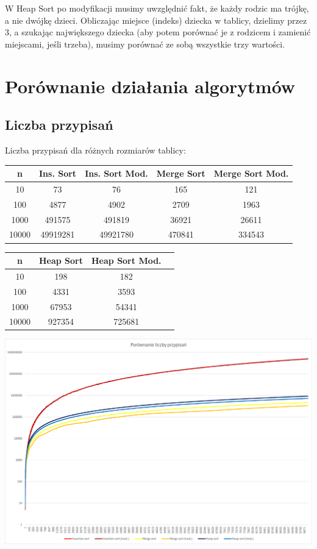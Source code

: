\documentclass{article}
\begin{document}
W Heap Sort po modyfikacji musimy uwzględnić fakt, że każdy rodzic ma trójkę, a nie dwójkę dzieci. Obliczając miejsce (indeks) dziecka w tablicy, dzielimy przez 3, a szukając największego dziecka (aby potem porównać je z rodzicem i zamienić miejscami, jeśli trzeba), musimy porównać ze sobą wszystkie trzy wartości.

\section{Porównanie działania algorytmów}

\subsection{Liczba przypisań}

Liczba przypisań dla różnych rozmiarów tablicy:

\begin{center}
\begin{tabular}{|c|c|c|c|c|}
 \hline
 n & Ins. Sort & Ins. Sort Mod. & Merge Sort & Merge Sort Mod. \\ 
 \hline
 10 & 73 & 76 & 165 & 121 \\
 100 & 4877 & 4902 & 2709 & 1963 \\
 1000 & 491575 & 491819 & 36921 & 26611 \\
 10000 & 49919281 & 49921780 & 470841 & 334543 \\
 \hline
\end{tabular}

\vspace{0.5cm}

\begin{tabular}{|c|c|c|c|}
 \hline
 n & Heap Sort & Heap Sort Mod. \\ 
 \hline
 10 & 198 & 182 \\
 100 & 4331 & 3593 \\
 1000 & 67953 & 54341 \\
 10000 & 927354 & 725681 \\
 \hline
\end{tabular}
\end{center}

\begin{center}
    \includegraphics[width=1\textwidth]{Wykres1.png}
\end{center}
\end{document}
